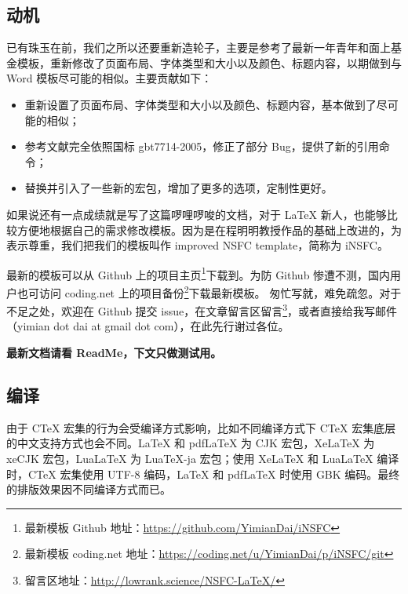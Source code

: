 \documentclass[a4paper,zihao=-4]{article}
\begin{document}
\subsection{动机}
已有珠玉在前，我们之所以还要重新造轮子，主要是参考了最新一年青年和面上基金模板，重新修改了页面布局、字体类型和大小以及颜色、标题内容，以期做到与 Word 模板尽可能的相似。主要贡献如下：
\begin{itemize}
	\item 重新设置了页面布局、字体类型和大小以及颜色、标题内容，基本做到了尽可能的相似；
	\item 参考文献完全依照国标 gbt7714-2005，修正了部分 Bug，提供了新的引用命令；
	\item 替换并引入了一些新的宏包，增加了更多的选项，定制性更好。
\end{itemize}
如果说还有一点成绩就是写了这篇啰哩啰唆的文档，对于 LaTeX 新人，也能够比较方便地根据自己的需求修改模板。因为是在程明明教授作品的基础上改进的，为表示尊重，我们把我们的模板叫作 improved NSFC template，简称为 iNSFC。

最新的模板可以从 Github 上的项目主页\footnote{最新模板 Github 地址：\href{https://github.com/YimianDai/iNSFC}{https://github.com/YimianDai/iNSFC}}下载到。为防 Github 惨遭不测，国内用户也可访问 coding.net 上的项目备份\footnote{最新模板 coding.net 地址：\href{https://coding.net/u/YimianDai/p/iNSFC/git}{https://coding.net/u/YimianDai/p/iNSFC/git}}下载最新模板。
匆忙写就，难免疏忽。对于不足之处，欢迎在 Github 提交 issue，在文章留言区留言\footnote{留言区地址：\href{http://lowrank.science/NSFC-LaTeX/}{http://lowrank.science/NSFC-LaTeX/}}，或者直接给我写邮件（yimian dot dai at gmail dot com），在此先行谢过各位。



\textbf{最新文档请看 ReadMe，下文只做测试用。}

\subsection{编译}
由于 CTeX 宏集的行为会受编译方式影响，比如不同编译方式下 CTeX 宏集底层的中文支持方式也会不同。LaTeX 和 pdfLaTeX 为 CJK 宏包，XeLaTeX 为 xeCJK 宏包，LuaLaTeX 为 LuaTeX-ja 宏包；使用 XeLaTeX 和 LuaLaTeX 编译时，CTeX 宏集使用 UTF-8 编码，LaTeX 和 pdfLaTeX 时使用 GBK 编码。最终的排版效果因不同编译方式而已。
\end{document}
